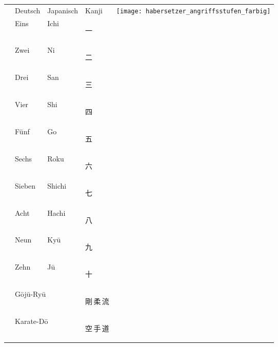 	\setcounter{num}{10}\setcounter{numz}{0}
	\null\vfill\null	
	\begin{tabularx}{\textwidth}{lllll}		
		& Deutsch 	& Japanisch 	& Kanji &\multirow{13}{*}{\qquad\texttt{[image: habersetzer\_angriffsstufen\_farbig]}}\\
		\cmidrule{2-4}
		\ctuz 	& Eins 				& Ichi 					& \begin{CJK*}{UTF8}{ipxm}\color{Navy}一\end{CJK*} 	& \\
		\ctuz 	& Zwei 				& Ni 					& \begin{CJK*}{UTF8}{ipxm}\color{Navy}二\end{CJK*} 	& \\ 
		\ctuz 	& Drei 				& San 					& \begin{CJK*}{UTF8}{ipxm}\color{Navy}三\end{CJK*} 	& \\
		\ctuz 	& Vier 				& Shi 					& \begin{CJK*}{UTF8}{ipxm}\color{Navy}四\end{CJK*} 	& \\
		\ctuz 	& Fünf 				& Go 					& \begin{CJK*}{UTF8}{ipxm}\color{Navy}五\end{CJK*} 	& \\
		\ctuz 	& Sechs 			& Roku 					& \begin{CJK*}{UTF8}{ipxm}\color{Navy}六\end{CJK*} 	& \\
		\ctuz 	& Sieben 			& Shichi 				& \begin{CJK*}{UTF8}{ipxm}\color{Navy}七\end{CJK*} 	& \\
		\ctuz 	& Acht 				& Hachi 				& \begin{CJK*}{UTF8}{ipxm}\color{Navy}八\end{CJK*} 	& \\
		\ctuz 	& Neun 				& Ky\={u} 					& \begin{CJK*}{UTF8}{ipxm}\color{Navy}九\end{CJK*} 	& \\
		\ctuz 	& Zehn 				& J\={u} 					& \begin{CJK*}{UTF8}{ipxm}\color{Navy}十\end{CJK*} 	& \\
		\addlinespace\addlinespace\addlinespace\addlinespace\addlinespace
		& \multicolumn{2}{l}{G\={o}j\={u}-Ry\={u}}	& {\LARGE \begin{CJK*}{UTF8}{ipxm}\color{GKD}剛\,柔\,流\end{CJK*}}        & \\ 	
		& \multicolumn{2}{l}{Karate-D\={o}}			& {\LARGE \begin{CJK*}{UTF8}{ipxm}空\,手\,道\end{CJK*}}        & \\
	\end{tabularx}
	\null\vfill\null